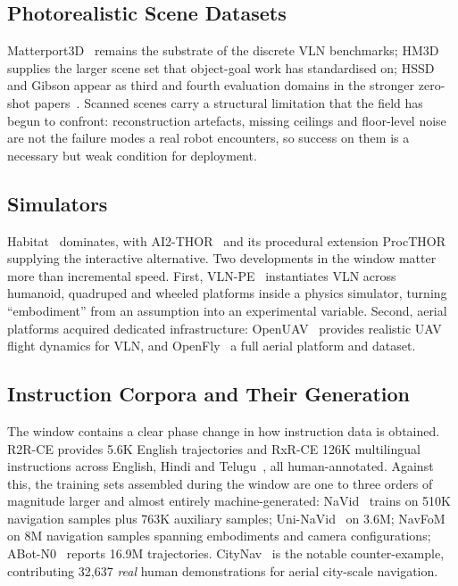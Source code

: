 \documentclass[journal]{IEEEtran}
\begin{document}
\subsection{Photorealistic Scene Datasets}
Matterport3D~\cite{chang2017matterport3d} remains the substrate of the
discrete VLN benchmarks; HM3D~\cite{ramakrishnan2021habitat} supplies the
larger scene set that object-goal work has standardised on; HSSD and Gibson
appear as third and fourth evaluation domains in the stronger zero-shot
papers~\cite{wu2024voronav,zhou2025beliefmapnav}. Scanned scenes carry a
structural limitation that the field has begun to confront: reconstruction
artefacts, missing ceilings and floor-level noise are not the failure modes
a real robot encounters, so success on them is a necessary but weak
condition for deployment.

\subsection{Simulators}
Habitat~\cite{savva2019habitat} dominates, with AI2-THOR~\cite{kolve2017ai2} and its procedural
extension ProcTHOR~\cite{deitke2022procthor} supplying the interactive
alternative. Two developments in the window matter more than incremental
speed. First, VLN-PE~\cite{wang2025rethinking} instantiates VLN across
humanoid, quadruped and wheeled platforms inside a physics simulator,
turning ``embodiment'' from an assumption into an experimental variable.
Second, aerial platforms acquired dedicated
infrastructure: OpenUAV~\cite{wang2025towards} provides realistic UAV flight
dynamics for VLN, and OpenFly~\cite{gao2026openfly} a full aerial platform
and dataset.

\subsection{Instruction Corpora and Their Generation}
The window contains a clear phase change in how instruction data is
obtained. R2R-CE provides 5.6K English trajectories and RxR-CE 126K
multilingual instructions across English, Hindi and
Telugu~\cite{wei2025streamvln}, all human-annotated. Against this,
the training sets assembled during the window are one to three orders of
magnitude larger and almost entirely machine-generated:
NaVid~\cite{zhang2024navid} trains on 510K navigation samples plus 763K
auxiliary samples; Uni-NaVid~\cite{zhang2024navidb} on 3.6M;
NavFoM~\cite{zhang2025embodied} on 8M navigation samples spanning
embodiments and camera configurations; ABot-N0~\cite{chu2026abot} reports
16.9M trajectories. CityNav~\cite{lee2024citynav} is the notable
counter-example, contributing 32{,}637 \emph{real} human demonstrations for
aerial city-scale navigation.
\end{document}
